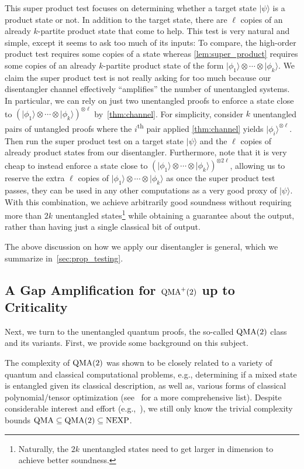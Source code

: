 \documentclass[10pt,a4paper]{article}
\theoremstyle{remark}
\newcommand{\eg}{e.g.,\xspace}
\newcommand{\1}[1]{\mathds{1}{[#1]}}
\newcommand{\ket}[1]{\lvert #1\rangle}
\newcommand{\QMA}{\textup{QMA}}
\newcommand{\NEXP}{\textup{NEXP}}
\numberwithin{equation}{section}
\begin{document}
This super product test focuses on determining whether a target state $\ket\psi$ is a product state or not.
%
In addition to the target state, there are $\ell$ copies of an already $k$-partite product state that come to help.
%
This test is very natural and simple, except it seems to ask too much of its inputs: To compare, the high-order
product test requires some copies of a state whereas \cref{lem:super_product} requires some copies of an already
$k$-partite product state of the form $\ket{\phi_1}\otimes \cdots \otimes \ket{\phi_k}$.
%
We claim the super product test is not really asking for too much because our disentangler channel effectively
``amplifies'' the number of unentangled systems.
%
In particular, we can rely on just two unentangled proofs to enforce a state close to 
$(\ket{\phi_1}\otimes \cdots \otimes \ket{\phi_k})^{\otimes \ell}$ by~\cref{thm:channel}. 
For simplicity, consider $k$ unentangled pairs of untangled proofs where the $i$\textsuperscript{th} pair applied \cref{thm:channel} yields $\ket{\phi_i}^{\otimes \ell}$. 
%
Then run the super product test on a target state $\ket{\psi}$ and the $\ell$ copies
of already product states from our disentangler.
%
Furthermore, note that it is very cheap to instead enforce a state close to
$(\ket{\phi_1}\otimes \cdots \otimes \ket{\phi_k})^{\otimes 2\ell}$, allowing us
to reserve the extra $\ell$ copies of $\ket{\phi_1}\otimes \cdots \otimes \ket{\phi_k}$
as once the super product test passes, they can be used in any other computations as
a very good proxy of $\ket\psi$.
%
With this combination, we achieve arbitrarily good soundness without requiring 
more than $2k$ unentangled states\footnote{Naturally, the $2k$ unentangled states
need to get larger in dimension to achieve better soundness.} while obtaining a
guarantee about the output, rather than having just a single classical bit of output. 

The above discussion on how we apply our disentangler is general, which we summarize in~\cref{sec:prop_testing}.

\subsection{A Gap Amplification for $\QMA^+(2)$ up to Criticality}

Next, we turn to the unentangled quantum proofs, the so-called $\QMA(2)$ class~\cite{KMY03}
and its variants.
%
First, we provide some background on this subject.

The complexity of $\QMA(2)$ was shown to be closely related to a variety
of quantum and classical computational problems, \eg determining if a
mixed state is entangled given its classical description, as well as,
various forms of classical polynomial/tensor optimization
(see~\cite{HM13} for a more comprehensive list).
%
Despite considerable interest and effort (\eg~\cite{DPS04,ABDFS08,BT09,Beigi10,BCY11,GNN12,SW12,P12,BH13,BH15,HNW17}),
we still only know the trivial complexity bounds $\QMA \subseteq \QMA(2) \subseteq \NEXP$.
\end{document}
